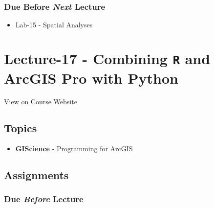 \documentclass[]{book}
\providecommand{\tightlist}{%
  \setlength{\itemsep}{0pt}\setlength{\parskip}{0pt}}
\begin{document}
\hypertarget{due-before-next-lecture-14}{%
\subsubsection*{\texorpdfstring{Due Before \emph{Next} Lecture}{Due Before Next Lecture}}\label{due-before-next-lecture-14}}

\begin{itemize}
\tightlist
\item
  Lab-15 - Spatial Analyses
\end{itemize}

\hypertarget{lecture-17---combining-r-and-arcgis-pro-with-python}{%
\section*{\texorpdfstring{Lecture-17 - Combining \texttt{R} and ArcGIS Pro with Python}{Lecture-17 - Combining R and ArcGIS Pro with Python}}\label{lecture-17---combining-r-and-arcgis-pro-with-python}}

View on Course Website

\hypertarget{topics-17}{%
\subsection*{Topics}\label{topics-17}}

\begin{itemize}
\tightlist
\item
  \textbf{GIScience} - Programming for ArcGIS
\end{itemize}

\hypertarget{assignments-18}{%
\subsection*{Assignments}\label{assignments-18}}

\hypertarget{due-before-lecture-16}{%
\subsubsection*{\texorpdfstring{Due \emph{Before} Lecture}{Due Before Lecture}}\label{due-before-lecture-16}}
\end{document}
